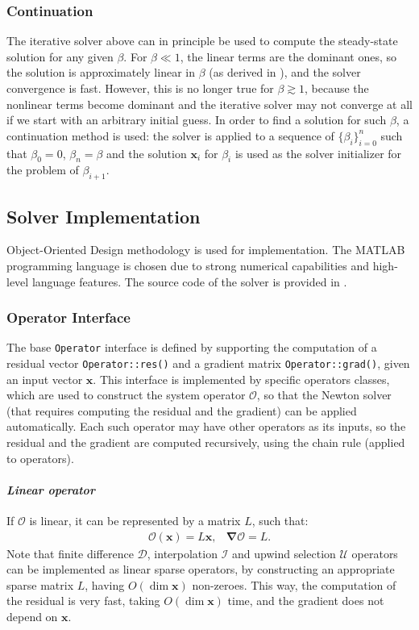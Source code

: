 \documentclass[10pt]{ijnam}
\newcommand\bnabla{\boldsymbol{\nabla}}
\newcommand\bx{\boldsymbol{x}}
\newcommand\cO{\mathcal{O}}
\newcommand\cI{\mathcal{I}}
\newcommand\cD{\mathcal{D}}
\begin{document}
\subsubsection{Continuation}

The iterative solver above can in principle be used 
to compute the steady-state solution for any given $\beta$.
For $\beta \ll 1$, the linear terms are the dominant ones, 
so the solution is approximately linear in $\beta$ 
(as derived in \cite{yariv2010migration}), and the solver convergence is fast.
However, this is no longer true for $\beta \gtrsim 1$, because the nonlinear terms become dominant
and the iterative solver may not converge at all if we start with an arbitrary initial guess.
In order to find a solution for such $\beta$, a continuation method is used:
the solver is applied to a sequence of $\{\beta_i\}_{i=0}^n$ such that $\beta_0 = 0$,
$\beta_n = \beta$ and the solution $\bx_i$ for $\beta_i$ is used as the solver initializer
for the problem of $\beta_{i+1}$.

\subsection{Solver Implementation}

Object-Oriented Design methodology is used for implementation.
The MATLAB programming language is chosen due to strong numerical capabilities
and high-level language features.
The source code of the solver is provided in \cite{source}.

\subsubsection{Operator Interface}
The base \verb|Operator| interface is defined by 
supporting the computation of a residual vector \verb|Operator::res()|
and a gradient matrix \verb|Operator::grad()|, given an input vector $\bx$.
This interface is implemented by specific operators classes,
which are used to construct the system operator $\cO$, so that 
the Newton solver (that requires computing the residual and the gradient) 
can be applied automatically.
Each such operator may have other operators as its inputs, so the residual
and the gradient are computed recursively, using the chain rule (applied to operators).

\paragraph{\textit{Linear operator}}
If $\cO$ is linear, it can be represented by a matrix $L$, such that:
\begin{equation}\begin{array}{cc}
\cO(\bx) = L \bx, &
\bnabla\cO = L. 
\end{array}\end{equation}
Note that finite difference $\cD$, interpolation $\cI$ and 
upwind selection $\mathcal{U}$ operators
can be implemented as linear sparse operators, by constructing 
an appropriate sparse matrix $L$, having $O(\dim \bx)$ non-zeroes.
This way, the computation of the residual is very fast, taking $O(\dim \bx)$ time,
and the gradient does not depend on $\bx$.
\end{document}
